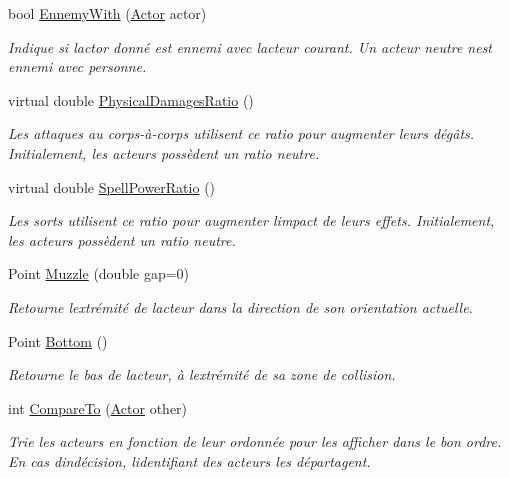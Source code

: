 \begin{DoxyCompactItemize}
bool \hyperlink{class_tentacle_slicers_1_1actors_1_1_actor_acc9e6224adeadcc335d7e3b446080b83}{Ennemy\+With} (\hyperlink{class_tentacle_slicers_1_1actors_1_1_actor}{Actor} actor)
\begin{DoxyCompactList}\small\item\em Indique si l\textquotesingle{}actor donné est ennemi avec l\textquotesingle{}acteur courant. Un acteur neutre n\textquotesingle{}est ennemi avec personne. \end{DoxyCompactList}\item 
virtual double \hyperlink{class_tentacle_slicers_1_1actors_1_1_actor_a8041088479e124a66c24d185f5385b2f}{Physical\+Damages\+Ratio} ()
\begin{DoxyCompactList}\small\item\em Les attaques au corps-\/à-\/corps utilisent ce ratio pour augmenter leurs dégâts. Initialement, les acteurs possèdent un ratio neutre. \end{DoxyCompactList}\item 
virtual double \hyperlink{class_tentacle_slicers_1_1actors_1_1_actor_a83e7b818449b5e92e3a7003c0cc6f571}{Spell\+Power\+Ratio} ()
\begin{DoxyCompactList}\small\item\em Les sorts utilisent ce ratio pour augmenter l\textquotesingle{}impact de leurs effets. Initialement, les acteurs possèdent un ratio neutre. \end{DoxyCompactList}\item 
Point \hyperlink{class_tentacle_slicers_1_1actors_1_1_actor_a780cf5a4c31f30307f67ac0a152ec7c0}{Muzzle} (double gap=0)
\begin{DoxyCompactList}\small\item\em Retourne l\textquotesingle{}extrémité de l\textquotesingle{}acteur dans la direction de son orientation actuelle. \end{DoxyCompactList}\item 
Point \hyperlink{class_tentacle_slicers_1_1actors_1_1_actor_aaf93f9e36eee2f41a47cf5c0b954b535}{Bottom} ()
\begin{DoxyCompactList}\small\item\em Retourne le bas de l\textquotesingle{}acteur, à l\textquotesingle{}extrémité de sa zone de collision. \end{DoxyCompactList}\item 
int \hyperlink{class_tentacle_slicers_1_1actors_1_1_actor_a55440b152571f25e7907a1c59b070aac}{Compare\+To} (\hyperlink{class_tentacle_slicers_1_1actors_1_1_actor}{Actor} other)
\begin{DoxyCompactList}\small\item\em Trie les acteurs en fonction de leur ordonnée pour les afficher dans le bon ordre. En cas d\textquotesingle{}indécision, l\textquotesingle{}identifiant des acteurs les départagent. \end{DoxyCompactList}\end{DoxyCompactItemize}
